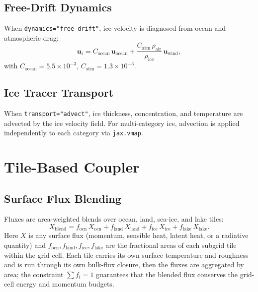 \documentclass[11pt,twoside]{report}
\newcommand{\vect}[1]{\bm{#1}}
\begin{document}
\section{Free-Drift Dynamics}

When \texttt{dynamics="free\_drift"}, ice velocity is diagnosed from ocean and atmospheric drag:
\begin{equation}
  \vect{u}_i = C_{\mathrm{ocean}}\,\vect{u}_{\mathrm{ocean}}
  + \frac{C_{\mathrm{atm}}\,\rho_{\mathrm{air}}}{\rho_{\mathrm{ice}}}\,\vect{u}_{\mathrm{wind}},
\end{equation}
with $C_{\mathrm{ocean}}=5.5\times10^{-3}$, $C_{\mathrm{atm}}=1.3\times10^{-3}$.

\section{Ice Tracer Transport}

When \texttt{transport="advect"}, ice thickness, concentration, and temperature are advected by the ice velocity field.  For multi-category ice, advection is applied independently to each category via \texttt{jax.vmap}.


\chapter{Tile-Based Coupler}
\label{ch:coupler}

\section{Surface Flux Blending}

Fluxes are area-weighted blends over ocean, land, sea-ice, and lake tiles:
\begin{equation}
  X_{\mathrm{blend}} = f_{\mathrm{ocn}}\,X_{\mathrm{ocn}}
  + f_{\mathrm{land}}\,X_{\mathrm{land}}
  + f_{\mathrm{ice}}\,X_{\mathrm{ice}}
  + f_{\mathrm{lake}}\,X_{\mathrm{lake}}.
\end{equation}
Here $X$ is any surface flux (momentum, sensible heat, latent heat, or a
radiative quantity) and $f_{\mathrm{ocn}},f_{\mathrm{land}},f_{\mathrm{ice}},
f_{\mathrm{lake}}$ are the fractional areas of each subgrid tile within the grid
cell.  Each tile carries its own surface temperature and roughness and is run
through its own bulk-flux closure, then the fluxes are aggregated by area; the
constraint $\sum f_i = 1$ guarantees that the blended flux conserves the
grid-cell energy and momentum budgets.
\end{document}
